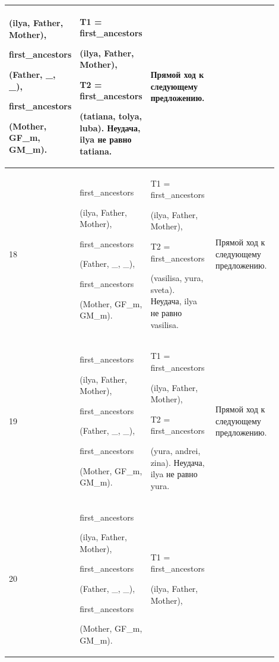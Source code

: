\documentclass[a4paper,12pt]{article}
\begin{document}
\begin{center}
\begin{longtable}[h!]{|p{0.05\linewidth}|p{0.25\linewidth}|p{ 0.3\linewidth}|p{ 0.3\linewidth}|}
{				(ilya, Father, Mother),
				
				first\_ancestors
				
				(Father, \_, \_),
				
				first\_ancestors
				
				(Mother, GF\_m, GM\_m).} & {T1 = first\_ancestors
				
				(ilya, Father, Mother),
				
				T2 = first\_ancestors
				
				(tatiana, tolya, luba). Неудача, ilya не равно tatiana.} & {Прямой ход к следующему предложению.}\\
			\hline
			{18} & {first\_ancestors
				
				(ilya, Father, Mother),
				
				first\_ancestors
				
				(Father, \_, \_),
				
				first\_ancestors
				
				(Mother, GF\_m, GM\_m).} & {T1 = first\_ancestors
				
				(ilya, Father, Mother),
				
				T2 = first\_ancestors
				
				(vasilisa, yura, sveta). Неудача, ilya не равно vasilisa.} & {Прямой ход к следующему предложению.}\\
			\hline
			{19} & {first\_ancestors
				
				(ilya, Father, Mother),
				
				first\_ancestors
				
				(Father, \_, \_),
				
				first\_ancestors
				
				(Mother, GF\_m, GM\_m).} & {T1 = first\_ancestors
				
				(ilya, Father, Mother),
				
				T2 = first\_ancestors
				
				(yura, andrei, zina). Неудача, ilya не равно yura.} & {Прямой ход к следующему предложению.}\\
			\hline
			{20} & {first\_ancestors
				
				(ilya, Father, Mother),
				
				first\_ancestors
				
				(Father, \_, \_),
				
				first\_ancestors
				
				(Mother, GF\_m, GM\_m).} & {T1 = first\_ancestors
				
				(ilya, Father, Mother),
				
}
\end{longtable}
\end{center}
\end{document}
